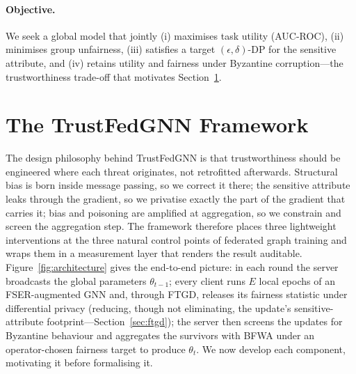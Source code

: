 \documentclass[pdflatex,sn-mathphys-num]{sn-jnl}
\theoremstyle{thmstyleone}%
\theoremstyle{thmstyletwo}%
\theoremstyle{thmstylethree}%
\begin{document}
\paragraph{Objective.}
We seek a global model that jointly (i) maximises task utility (AUC-ROC), (ii)
minimises group unfairness, (iii) satisfies a target $(\epsilon,\delta)$-DP for
the sensitive attribute, and (iv) retains utility and fairness under Byzantine
corruption---the trustworthiness trade-off that motivates
Section~\ref{sec:method}.

\section{The TrustFedGNN Framework}
\label{sec:method}

The design philosophy behind TrustFedGNN is that trustworthiness should be
engineered where each threat originates, not retrofitted afterwards. Structural
bias is born inside message passing, so we correct it there; the sensitive
attribute leaks through the gradient, so we privatise exactly the part of the
gradient that carries it; bias and poisoning are amplified at aggregation, so we
constrain and screen the aggregation step. The framework therefore places three
lightweight interventions at the three natural control points of federated graph
training and wraps them in a measurement layer that renders the result
auditable. Figure~\ref{fig:architecture} gives the end-to-end picture: in each
round the server broadcasts the global parameters $\theta_{t-1}$; every client
runs $E$ local epochs of an FSER-augmented GNN and, through FTGD, releases its
fairness statistic under differential privacy (reducing, though not eliminating,
the update's sensitive-attribute footprint---Section~\ref{sec:ftgd}); the server
then screens the updates for Byzantine behaviour and aggregates the survivors
with BFWA under an operator-chosen fairness target to produce $\theta_t$. We now
develop each
component, motivating it before formalising it.
\end{document}
